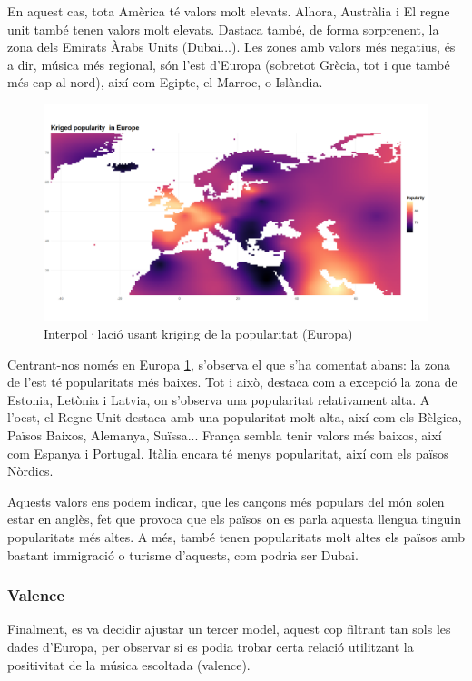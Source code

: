 En aquest cas, tota Amèrica té valors molt elevats. Alhora, Austràlia i El regne unit també tenen valors molt elevats. Dastaca també, de forma sorprenent, la zona dels Emirats Àrabs Units (Dubai...). Les zones amb valors més negatius, és a dir, música més regional, són l'est d'Europa (sobretot Grècia, tot i que també més cap al nord), així com Egipte, el Marroc, o Islàndia.

\begin{figure}[H]
    \centering
    \includegraphics[width=0.75\linewidth]{Images//7_Geospatial//3_new/popularity_interpolation_europe.png}
    \caption{Interpol·lació usant kriging de la popularitat (Europa)}
    \label{fig:geo_new_pop_interpol_eur}
\end{figure}

Centrant-nos només en Europa \ref{fig:geo_new_pop_interpol_eur}, s'observa el que s'ha comentat abans: la zona de l'est té popularitats més baixes. Tot i això, destaca com a excepció la zona de Estonia, Letònia i Latvia, on s'observa una popularitat relativament alta. A l'oest, el Regne Unit destaca amb una popularitat molt alta, així com els Bèlgica, Països Baixos, Alemanya, Suïssa... França sembla tenir valors més baixos, així com Espanya i Portugal. Itàlia encara té menys popularitat, així com els països Nòrdics.

Aquests valors ens podem indicar, que les cançons més populars del món solen estar en anglès, fet que provoca que els països on es parla aquesta llengua tinguin popularitats més altes. A més, també tenen popularitats molt altes els països amb bastant immigració o turisme d'aquests, com podria ser Dubai.


\subsubsection{Valence}

Finalment, es va decidir ajustar un tercer model, aquest cop filtrant tan sols les dades d'Europa, per observar si es podia trobar certa relació utilitzant la positivitat de la música escoltada (valence).

